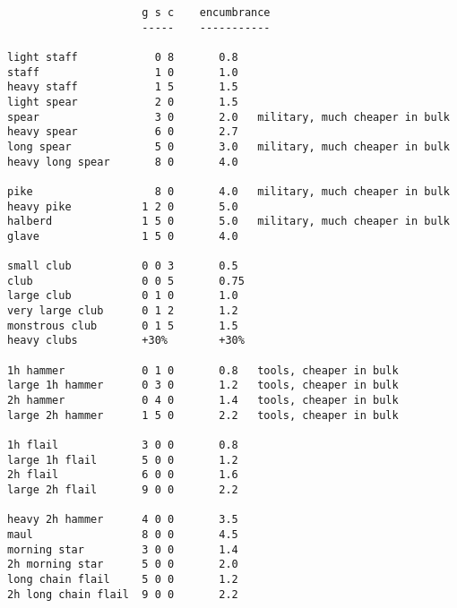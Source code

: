 \small \begin{verbatim}
                     g s c    encumbrance
                     -----    -----------

light staff            0 8       0.8
staff                  1 0       1.0
heavy staff            1 5       1.5
light spear            2 0       1.5
spear                  3 0       2.0   military, much cheaper in bulk
heavy spear            6 0       2.7
long spear             5 0       3.0   military, much cheaper in bulk
heavy long spear       8 0       4.0

pike                   8 0       4.0   military, much cheaper in bulk
heavy pike           1 2 0       5.0
halberd              1 5 0       5.0   military, much cheaper in bulk
glave                1 5 0       4.0

small club           0 0 3       0.5
club                 0 0 5       0.75
large club           0 1 0       1.0
very large club      0 1 2       1.2
monstrous club       0 1 5       1.5
heavy clubs          +30%        +30%

1h hammer            0 1 0       0.8   tools, cheaper in bulk
large 1h hammer      0 3 0       1.2   tools, cheaper in bulk
2h hammer            0 4 0       1.4   tools, cheaper in bulk
large 2h hammer      1 5 0       2.2   tools, cheaper in bulk

1h flail             3 0 0       0.8
large 1h flail       5 0 0       1.2
2h flail             6 0 0       1.6
large 2h flail       9 0 0       2.2

heavy 2h hammer      4 0 0       3.5
maul                 8 0 0       4.5
morning star         3 0 0       1.4
2h morning star      5 0 0       2.0
long chain flail     5 0 0       1.2
2h long chain flail  9 0 0       2.2
\end{verbatim} \normalsize
\pagebreak[1]



